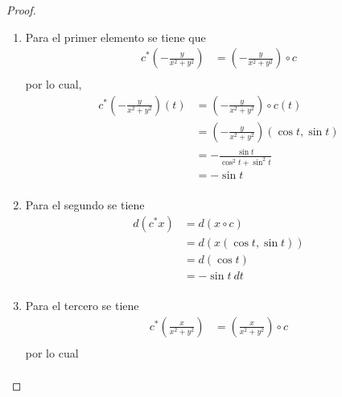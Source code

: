 \documentclass[12pt]{report}
\theoremstyle{largebreak}
\begin{document}
\begin{proof}
\begin{enumerate}
            \item Para el primer elemento se tiene que
            \begin{equation*}
                \begin{split}
                    c^*\left(-\frac{y}{x^2+y^2}\right)&=\left(-\frac{y}{x^2+y^2}\right)\circ c\\
                \end{split}
            \end{equation*}
            por lo cual,
            \begin{equation*}
                \begin{split}
                    c^*\left(-\frac{y}{x^2+y^2}\right)(t)&=\left(-\frac{y}{x^2+y^2}\right)\circ c(t)\\
                    &=\left(-\frac{y}{x^2+y^2}\right)(\cos t, \sin t)\\
                    &=-\frac{\sin t}{\cos^2t+\sin^2t}\\
                    &=-\sin t\\
                \end{split}
            \end{equation*}
            \item Para el segundo se tiene
            \begin{equation*}
                \begin{split}
                    d\left(c^*x\right)&=d\left(x\circ c\right)\\
                    &=d\left(x(\cos t,\sin t)\right)\\
                    &=d\left(\cos t\right)\\
                    &=-\sin t\:dt\\
                \end{split}
            \end{equation*}
            \item Para el tercero se tiene
            \begin{equation*}
                \begin{split}
                    c^*\left(\frac{x}{x^2+y^2}\right)&=\left(\frac{x}{x^2+y^2}\right)\circ c \\
                \end{split}
            \end{equation*}
            por lo cual
            \begin{equation*}
                \begin{split}

\end{split}
\end{equation*}
\end{enumerate}
\end{proof}
\end{document}
